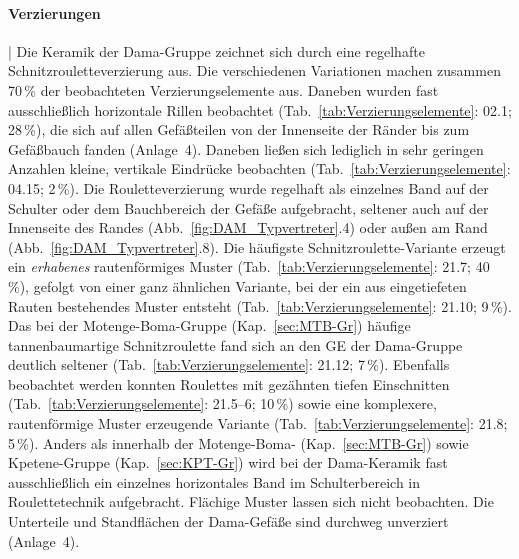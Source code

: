 \paragraph{Verzierungen}\hspace{-.5em}|\hspace{.5em}%
Die Keramik der Dama-Gruppe zeichnet sich durch eine regelhafte Schnitzrouletteverzierung aus. Die verschiedenen Variationen machen zusammen 70\,\% der beobachteten Verzierungselemente aus. Daneben wurden fast ausschließlich horizontale Rillen beobachtet (Tab.~\ref{tab:Verzierungselemente}: 02.1; 28\,\%), die sich auf allen Gefäßteilen von der Innenseite der Ränder bis zum Gefäßbauch fanden (Anlage~4). Daneben ließen sich lediglich in sehr geringen Anzahlen kleine, vertikale Eindrücke beobachten (Tab.~\ref{tab:Verzierungselemente}: 04.15; 2\,\%). Die Rouletteverzierung wurde regelhaft als einzelnes Band auf der Schulter oder dem Bauchbereich der Gefäße aufgebracht, seltener auch auf der Innenseite des Randes (Abb.~\ref{fig:DAM_Typvertreter}.4) oder außen am Rand (Abb.~\ref{fig:DAM_Typvertreter}.8). Die häufigste Schnitzroulette-Variante erzeugt ein \textit{erhabenes} rautenförmiges Muster (Tab.~\ref{tab:Verzierungselemente}: 21.7; 40\,\%), gefolgt von einer ganz ähnlichen Variante, bei der ein aus eingetiefeten Rauten bestehendes Muster entsteht (Tab.~\ref{tab:Verzierungselemente}: 21.10; 9\,\%). Das bei der Motenge-Boma-Gruppe (Kap.~\ref{sec:MTB-Gr}) häufige tannenbaumartige Schnitzroulette fand sich an den GE der Dama-Gruppe deutlich seltener (Tab.~\ref{tab:Verzierungselemente}: 21.12; 7\,\%). Ebenfalls beobachtet werden konnten Roulettes mit gezähnten tiefen Einschnitten (Tab.~\ref{tab:Verzierungselemente}: 21.5--6; 10\,\%) sowie eine komplexere, rautenförmige Muster erzeugende Variante (Tab.~\ref{tab:Verzierungselemente}: 21.8; 5\,\%). Anders als innerhalb der Motenge-Boma- (Kap.~\ref{sec:MTB-Gr}) sowie Kpetene-Gruppe (Kap.~\ref{sec:KPT-Gr}) wird bei der Dama-Keramik fast ausschließlich ein einzelnes horizontales Band im Schulterbereich in  Roulettetechnik aufgebracht. Flächige Muster lassen sich nicht beobachten. Die Unterteile und Standflächen der Dama-Gefäße sind durchweg unverziert (Anlage~4).

